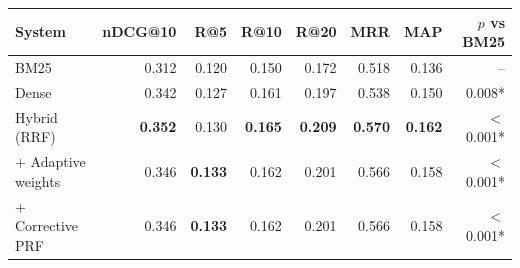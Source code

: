 \begin{tabular}{lrrrrrrr}
\toprule
System & nDCG@10 & R@5 & R@10 & R@20 & MRR & MAP & $p$ vs BM25 \\
\midrule
BM25 & 0.312 & 0.120 & 0.150 & 0.172 & 0.518 & 0.136 & -- \\
Dense & 0.342 & 0.127 & 0.161 & 0.197 & 0.538 & 0.150 & 0.008* \\
\midrule
Hybrid (RRF) & \textbf{0.352} & 0.130 & \textbf{0.165} & \textbf{0.209} & \textbf{0.570} & \textbf{0.162} & $<$0.001* \\
+ Adaptive weights & 0.346 & \textbf{0.133} & 0.162 & 0.201 & 0.566 & 0.158 & $<$0.001* \\
+ Corrective PRF & 0.346 & \textbf{0.133} & 0.162 & 0.201 & 0.566 & 0.158 & $<$0.001* \\
\bottomrule
\end{tabular}
